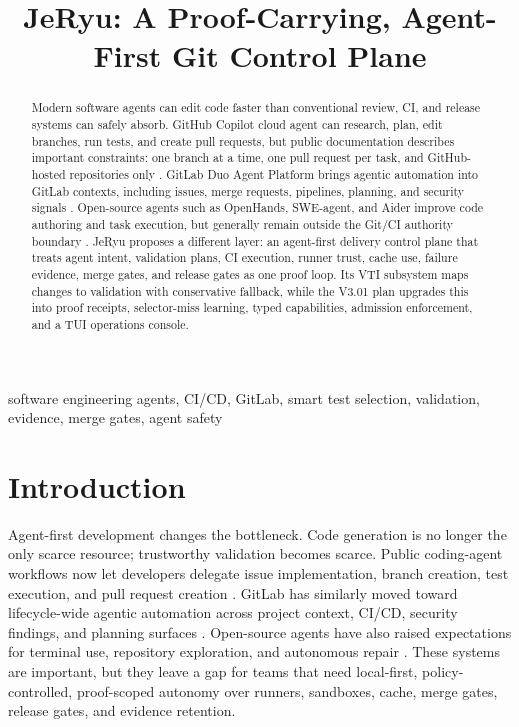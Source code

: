 \documentclass[conference]{IEEEtran}
\title{JeRyu: A Proof-Carrying, Agent-First Git Control Plane}
\author{\IEEEauthorblockN{JeRyu Project}
\IEEEauthorblockA{Draft for V3.01\\
Agent-first GitLab control plane, VTI, evidence, and merge-gate architecture}}
\begin{document}
\maketitle

\begin{abstract}
Modern software agents can edit code faster than conventional review, CI, and release systems can safely absorb. GitHub Copilot cloud agent can research, plan, edit branches, run tests, and create pull requests, but public documentation describes important constraints: one branch at a time, one pull request per task, and GitHub-hosted repositories only \cite{github-copilot-cloud-agent}. GitLab Duo Agent Platform brings agentic automation into GitLab contexts, including issues, merge requests, pipelines, planning, and security signals \cite{gitlab-duo-ga,gitlab-duo-platform,gitlab-duo-workflow}. Open-source agents such as OpenHands, SWE-agent, and Aider improve code authoring and task execution, but generally remain outside the Git/CI authority boundary \cite{openhands-paper,sweagent-paper,aider-repo}. JeRyu proposes a different layer: an agent-first delivery control plane that treats agent intent, validation plans, CI execution, runner trust, cache use, failure evidence, merge gates, and release gates as one proof loop. Its VTI subsystem maps changes to validation with conservative fallback, while the V3.01 plan upgrades this into proof receipts, selector-miss learning, typed capabilities, admission enforcement, and a TUI operations console.
\end{abstract}

\begin{IEEEkeywords}
software engineering agents, CI/CD, GitLab, smart test selection, validation, evidence, merge gates, agent safety
\end{IEEEkeywords}

\section{Introduction}
Agent-first development changes the bottleneck. Code generation is no longer the only scarce resource; trustworthy validation becomes scarce. Public coding-agent workflows now let developers delegate issue implementation, branch creation, test execution, and pull request creation \cite{github-copilot-cloud-agent,github-copilot-howto}. GitLab has similarly moved toward lifecycle-wide agentic automation across project context, CI/CD, security findings, and planning surfaces \cite{gitlab-duo-ga,gitlab-duo-platform,gitlab-duo-docs}. Open-source agents have also raised expectations for terminal use, repository exploration, and autonomous repair \cite{openhands-paper,sweagent-paper,aider-repo}. These systems are important, but they leave a gap for teams that need local-first, policy-controlled, proof-scoped autonomy over runners, sandboxes, cache, merge gates, release gates, and evidence retention.
\end{document}
